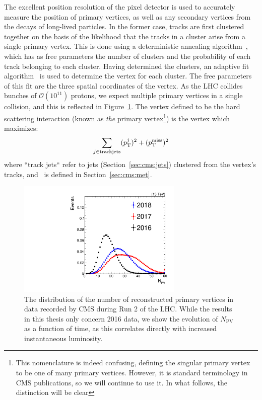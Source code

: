 The excellent position resolution of the pixel detector is used to accurately measure the position of primary vertices, as well as any secondary vertices from the decays of long-lived particles.
In the former case, tracks are first clustered together on the basis of the likelihood that the tracks in a cluster arise from a single primary vertex.
This is done using a deterministic annealing algorithm~\cite{da}, which has as free parameters the number of clusters and the probability of each track belonging to each cluster.
Having determined the clusters, an adaptive fit algorithm~\cite{adaptivefit} is used to determine the vertex for each cluster.
The free parameters of this fit are the three spatial coordinates of the vertex.
As the LHC collides bunches of $\mathcal{O}(10^{11})$ protons, we expect multiple primary vertices in a single collision, and this is reflected in Figure~\ref{fig:cms:npv}.
The vertex defined to be the hard scattering interaction (known as \emph{the} primary vertex\footnote{This nomenclature is indeed confusing, defining the singular primary vertex to be one of many primary vertices. However, it is standard terminology in CMS publications, so we will continue to use it. In what follows, the distinction will be clear}) is the vertex which maximizes:
\begin{equation}
	\sum_{j\in\mathrm{track jets}} (p_\mathrm{T}^j)^2 + (p_\mathrm{T}^\mathrm{miss})^2
\end{equation}
where ``track jets`` refer to jets (Section~\ref{sec:cms:jets}) clustered from the vertex's tracks, and \ptmiss~is defined in Section~\ref{sec:cms:met}.

\begin{figure}
    \begin{center} 
        \includegraphics[width=0.7\textwidth]{figures/cms/comparison_npv.pdf}
        \caption{The distribution of the number of reconstructed primary vertices in data recorded by CMS during Run 2 of the LHC.
				 While the results in this thesis only concern 2016 data, we show the evolution of $N_\mathrm{PV}$ as a function of time, as this correlates directly with increased instantaneous luminosity.}
        \label{fig:cms:npv}
    \end{center}
\end{figure}

